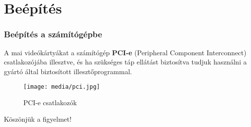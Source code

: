 \documentclass{beamer}
\begin{document}
\section{Beépítés}
\begin{frame}
\frametitle{Beépítés a számítógépbe}
A mai videókártyákat a számítógép \textbf{PCI-e} (Peripheral Component Interconnect) csatlakozójába illesztve, és ha szükséges táp ellátást biztosítva tudjuk használni a gyártó által biztosított illesztőprogrammal.

\begin{figure}
\centering
\texttt{[image: media/pci.jpg]}
\caption{PCI-e csatlakozók}
\end{figure}
\end{frame}

\begin{frame}
\begin{center}
\begin{huge}
Köszönjük a figyelmet!
\end{huge}
\end{center}
\end{frame}
\end{document}
